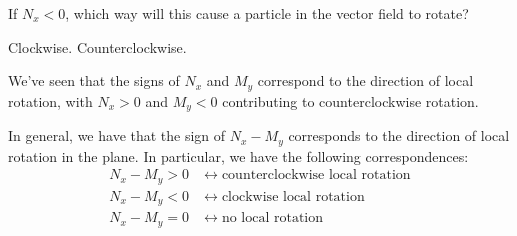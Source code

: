\documentclass{ximera}
\begin{document}
\begin{selectAll}
\end{selectAll}

If $N_x<0$, which way will this cause a particle in the vector field to rotate?
\begin{multipleChoice}
\choice Clockwise.
\choice[correct] Counterclockwise.
\end{multipleChoice}

We've seen that the signs of $N_x$ and $M_y$ correspond to the direction of local rotation, with $N_x>0$ and $M_y<0$ contributing to counterclockwise rotation. 

In general, we have that the sign of $N_x-M_y$ corresponds to the direction of local rotation in the plane. In particular, we have the following correspondences:
\begin{align}
N_x-M_y>0\;&\longleftrightarrow\; \textrm{counterclockwise local rotation}\\
N_x-M_y<0\;&\longleftrightarrow\; \textrm{clockwise local rotation}\\
N_x-M_y=0\;&\longleftrightarrow\; \textrm{no local rotation}\\
\end{align}
\end{document}
